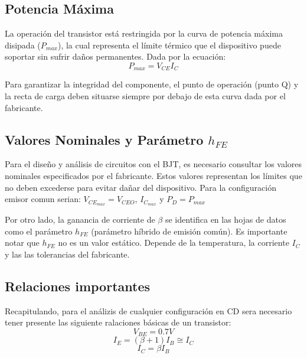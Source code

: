 \documentclass[journal]{IEEEtran}
\begin{document}
    \subsection{Potencia Máxima}
    La operación del transistor está restringida por la curva de potencia máxima disipada ($P_{max}$),
    la cual representa el límite térmico que el dispositivo puede soportar sin sufrir daños permanentes.
    Dada por la ecuación:
    \begin{equation*}
        P_{max} = V_{CE} I_C 
    \end{equation*}

    Para garantizar la integridad del componente, el punto de operación (punto Q) y la recta de carga 
    deben situarse siempre por debajo de esta curva dada por el fabricante.

    \subsection{Valores Nominales y Parámetro $h_{FE}$}
    Para el diseño y análisis de circuitos con el BJT, es necesario consultar los valores nominales especificados por el fabricante.
    Estos valores representan los límites que no deben excederse para evitar dañar del dispositivo. Para la configuración
    emisor comun serian: $V_{CE_{max}} = V_{CEO}$, $I_{C_{max}}$ y $P_D = P_{max}$
    
    Por otro lado, la ganancia de corriente de $\beta$ se identifica en las hojas de datos como el parámetro $h_{FE}$ 
    (parámetro híbrido de emisión común). Es importante notar que $h_{FE}$ no es un valor estático. Depende de la temperatura,
    la corriente $I_C$ y las las tolerancias del fabricante.

    \subsection{Relaciones importantes}
    Recapitulando, para el análizis de cualquier configuración en CD sera necesario
    tener presente las siguiente ralaciones básicas de un transistor:
    \begin{equation}
        V_{BE} = 0.7 V
    \end{equation}
    \begin{equation}
        I_E = (\beta + 1) I_B \cong I_C
    \end{equation}
    \begin{equation}
        I_C = \beta I_B
    \end{equation}
\end{document}
